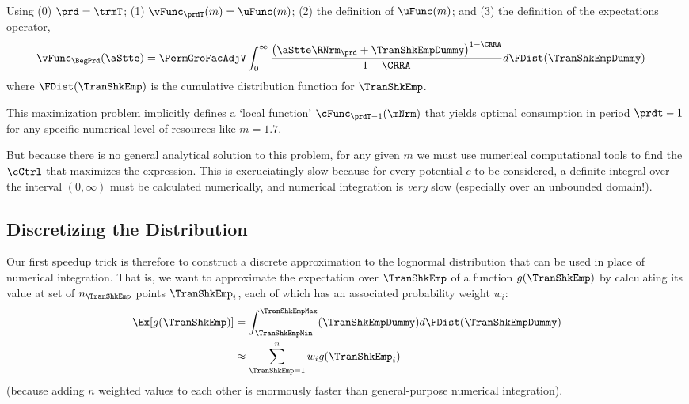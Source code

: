 \documentclass[\econtexRoot/SolvingMicroDSOPs]{subfiles}
\begin{document}
Using (0) $\prd=\trmT$; (1) $\vFunc_{\prdT}(m)=\uFunc(m)$; (2) the definition of $\uFunc(m)$; and (3) the definition of the expectations operator,  %
\begin{equation}\begin{gathered}\begin{aligned}
      \vFunc_{\BegPrd}(\aStte)   & = \PermGroFacAdjV\int_{0}^{\infty} \frac{\left(\aStte \RNrm_{\prd}+ \TranShkEmpDummy\right)^{1-\CRRA}}{1-\CRRA}  d\FDist(\TranShkEmpDummy) \label{eq:NumDefInt}
    \end{aligned}\end{gathered}\end{equation}
where $\FDist(\TranShkEmp)$ is the cumulative distribution function for ${\TranShkEmp}$.

\lstset{basicstyle=\ttfamily\footnotesize,breaklines=true,language=Python,frame=single}


This maximization problem implicitly defines a `local function' $\cFunc_{\prdT-1}(\mNrm)$ that yields optimal consumption in period $\prdt-1$ for any specific numerical level of resources like $m=1.7$.%

But because there is no general analytical solution to this problem, for any given $m$ we must use numerical computational tools to find the $\cCtrl$ that maximizes the expression.  This is excruciatingly slow because for every potential $c$ to be considered, a definite integral over the interval $(0,\infty)$ must be calculated numerically, and numerical integration is \textit{very} slow (especially over an unbounded domain!).

\hypertarget{discretizing-the-distribution}{}
\subsection{Discretizing the Distribution}
Our first speedup trick is therefore to construct a discrete approximation to the lognormal distribution that can be used in place of numerical integration.  That is, we want to approximate the expectation over $\TranShkEmp$ of a function $g(\TranShkEmp)$ by calculating its value at set of $n_{\TranShkEmp}$ points $\TranShkEmp_{i}$, each of which has an associated probability weight $w_{i}$:
\begin{equation*}\begin{gathered}\begin{aligned}
      \Ex[g(\TranShkEmp)] & = \int_{\TranShkEmpMin}^{\TranShkEmpMax}(\TranShkEmpDummy)d\FDist(\TranShkEmpDummy) \\
      & \approx \sum_{\TranShkEmp = 1}^{n}w_{i}g(\TranShkEmp_{i})
    \end{aligned}\end{gathered}\end{equation*}
(because adding $n$ weighted values to each other is enormously faster than general-purpose numerical integration).
\end{document}
